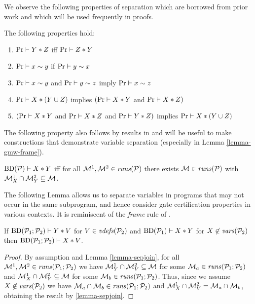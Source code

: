 We observe the following properties of separation which are borrowed from prior work
\cite{barthe2019probabilistic} and which will be used frequently in proofs. 
\begin{lemma}
  \label{lemma-separation}
  The following properties hold:
  \begin{enumerate}
  \item $\mathrm{Pr} \vdash Y * Z$ iff $\mathrm{Pr} \vdash Z * Y$
  \item $\mathrm{Pr} \vdash x \sim y$ if  $\mathrm{Pr} \vdash y \sim x$
  \item $\mathrm{Pr} \vdash x \sim y$ and $\mathrm{Pr} \vdash y \sim z$ imply $\mathrm{Pr} \vdash x \sim z$
  \item $\mathrm{Pr} \vdash X * (Y \cup Z)$ implies $(\mathrm{Pr} \vdash X * Y$ and $\mathrm{Pr} \vdash X * Z)$
  \item $(\mathrm{Pr} \vdash X * Y$ and $\mathrm{Pr} \vdash X * Z$ and $\mathrm{Pr} \vdash Y * Z)$ implies $\mathrm{Pr} \vdash X * (Y \cup Z)$ 
  \end{enumerate}
\end{lemma}
The following property also follows by results in \cite{barthe2019probabilistic} and will
be useful to make constructions that demonstrate variable separation (especially in Lemma
\ref{lemma-gmw-frame}).
\begin{lemma}
  \label{lemma-sepjoin}
  $\mathrm{BD}(\mathcal{P}) \vdash X * Y$ iff for all 
  $\mathcal{M}^1, \mathcal{M}^2 \in \mathit{runs}(\mathcal{P})$ there exists
  $\mathcal{M} \in \mathit{runs}(\mathcal{P})$ with
  $\mathcal{M}^1_{X} \cap \mathcal{M}^2_{Y} \subseteq \mathcal{M}$.
\end{lemma}

The following Lemma allows us to separate variables in programs that may not occur
in the same subprogram, and hence consider gate certification properties in various
contexts. It is reminiscent of the \emph{frame} rule of \cite{barthe2019probabilistic}.
\begin{lemma}
  \label{lemma-gmw-frame}
  If $\mathrm{BD}(\mathcal{P}_1;\mathcal{P}_2) \vdash Y * V$ for $V \in \mathit{vdefs}(\mathcal{P}_2)$ and $\mathrm{BD}(\mathcal{P}_1) \vdash X * Y$ for
  $X \not\in \mathit{vars}(\mathcal{P}_2)$ then $\mathrm{BD}(\mathcal{P}_1;\mathcal{P}_2) \vdash X * V$. 
\end{lemma}
\begin{proof}
  By assumption and Lemma \ref{lemma-sepjoin}, for all
  $\mathcal{M}^1,\mathcal{M}^2 \in \mathit{runs}(\mathcal{P}_1;\mathcal{P}_2)$ we have $\mathcal{M}^1_Y
  \cap \mathcal{M}^2_V \subseteq \mathcal{M}$ for some $\mathcal{M}_a \in
  \mathit{runs}(\mathcal{P}_1;\mathcal{P}_2)$ and $\mathcal{M}^1_X \cap \mathcal{M}^2_Y \subseteq
  \mathcal{M}$ for some $\mathcal{M}_b \in \mathit{runs}(\mathcal{P}_1;\mathcal{P}_2)$.  Thus, since
  we assume $X \not\in \mathit{vars}(\mathcal{P}_2)$ we have $\mathcal{M}_a \cap \mathcal{M}_b
  \in \mathit{runs}(\mathcal{P}_1;\mathcal{P}_2)$ and $\mathcal{M}^1_X \cap \mathcal{M}^2_V =
  \mathcal{M}_a \cap \mathcal{M}_b$, obtaining the result by
  \ref{lemma-sepjoin}.
\end{proof}

